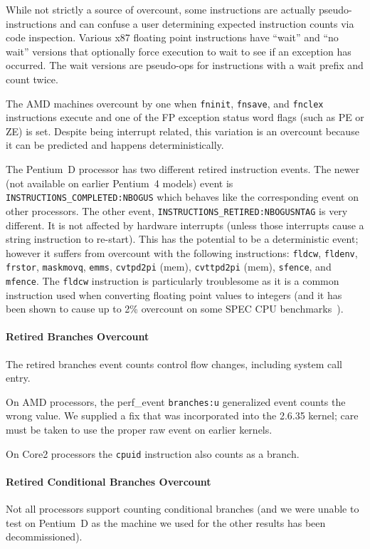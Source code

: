 While not strictly a source of overcount, some instructions are
actually pseudo-instructions and can confuse a user 
determining expected instruction counts
via code inspection.
Various x87 floating point instructions have ``wait'' and ``no wait''
versions that optionally force execution to wait to see if an exception
has occurred.  
The wait versions are pseudo-ops for instructions with a wait prefix
and count twice.

The AMD machines overcount by one when
{\tt fninit}, {\tt fnsave}, and {\tt fnclex} instructions execute
and one of the FP exception status word flags (such as PE or ZE) is set.
Despite being interrupt related, this variation
is an overcount because it can be predicted and happens deterministically.

The Pentium~D processor has two different 
retired instruction events.  
The newer (not available on earlier Pentium~4 models)
event is {\tt INSTRUCTIONS\_COMPLETED:NBOGUS} which behaves like the 
corresponding event on other processors.
The other event, {\tt INSTRUCTIONS\-\_RETIRED\-:NBOGUSNTAG} is very different.
It is not affected by hardware interrupts (unless those interrupts cause a 
string instruction to re-start).  
This has the potential to be a deterministic event; however 
it suffers from overcount with the following instructions:
{\tt fldcw}, 
{\tt fldenv}, {\tt frstor}, {\tt maskmovq}, {\tt emms}, {\tt cvtpd2pi} (mem),
{\tt cvttpd2pi} (mem), {\tt sfence}, and {\tt mfence}.  
The {\tt fldcw}
instruction is particularly troublesome as it is a common instruction
used when converting floating point values to integers (and it has
been shown to cause up to 2\%
overcount on some SPEC CPU benchmarks~\cite{weaver+:iiswc08}).

\paragraph{Retired Branches Overcount}
The retired branches event counts control flow changes, 
including system call entry.

On AMD processors, the perf\_event {\tt branches:u} generalized event counts 
the wrong value.  We supplied a fix that was incorporated into the 2.6.35
kernel; care must be taken to use the proper 
raw event on earlier kernels.

On Core2 processors the {\tt cpuid} instruction also counts as a branch.

\paragraph{Retired Conditional Branches Overcount}
Not all processors support counting 
conditional branches (and we were unable
to test on Pentium~D as the machine we used 
for the other results has been decommissioned).

